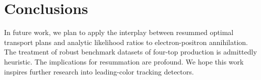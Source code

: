 \section{Conclusions}\label{sec:conclusions}

In future work, we plan to apply the interplay between resummed optimal
transport plans and analytic likelihood ratios to electron-positron
annihilation. The treatment of robust benchmark datasets of four-top
production is admittedly heuristic. The implications for resummation are
profound. We hope this work inspires further research into leading-color
tracking detectors.

